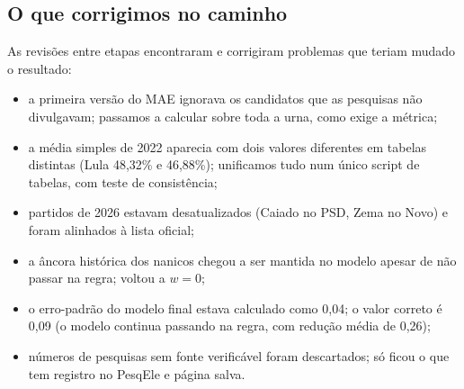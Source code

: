 \documentclass[10.5pt,a4paper]{article}
\begin{document}
\subsection{O que corrigimos no caminho}
As revisões entre etapas encontraram e corrigiram problemas que teriam mudado o resultado:
\begin{itemize}
\item a primeira versão do MAE ignorava os candidatos que as pesquisas não divulgavam; passamos a calcular sobre toda a urna, como exige a métrica;
\item a média simples de 2022 aparecia com dois valores diferentes em tabelas distintas (Lula 48,32\% e 46,88\%); unificamos tudo num único script de tabelas, com teste de consistência;
\item partidos de 2026 estavam desatualizados (Caiado no PSD, Zema no Novo) e foram alinhados à lista oficial;
\item a âncora histórica dos nanicos chegou a ser mantida no modelo apesar de não passar na regra; voltou a $w=0$;
\item o erro-padrão do modelo final estava calculado como 0,04; o valor correto é 0,09 (o modelo continua passando na regra, com redução média de 0,26);
\item números de pesquisas sem fonte verificável foram descartados; só ficou o que tem registro no PesqEle e página salva.
\end{itemize}
\end{document}
